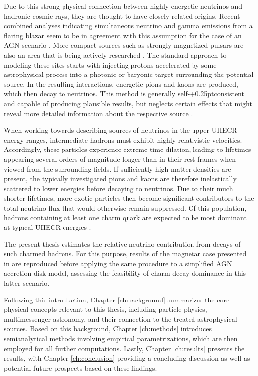 Due to this strong physical connection between highly energetic neutrinos and hadronic cosmic rays, they are thought to have
closely related origins. Recent combined analyses indicating simultaneous neutrino and gamma emissions from a
flaring blazar seem to be in agreement with this assumption for the case of an AGN scenario \cite{ic_blazar_flare, ic_blazar_signal}.
More compact sources such as strongly magnetized pulsars are also an area that is being actively researched \cite{Murase_2009}.
The standard approach to modeling these sites starts with injecting protons accelerated by some astrophysical process into
a photonic or baryonic target surrounding the potential source. In the resulting interactions, energetic pions and kaons are
produced, which then decay to neutrinos. This method is generally self-{\kern+0.25pt}consistent and capable of producing
plausible results, but neglects certain effects that might reveal more detailed information about the respective source
\cite{Carpio_2020}.

When working towards describing sources of neutrinos in the upper UHECR energy ranges, intermediate hadrons must exhibit
highly relativistic velocities. Accordingly, these particles experience extreme time dilation, leading to lifetimes
appearing several orders of magnitude longer than in their rest frames when viewed from the surrounding fields.
If sufficiently high matter densities are present, the typically investigated pions and kaons are therefore inelastically
scattered to lower energies before decaying to neutrinos. Due to their much shorter lifetimes, more exotic particles then
become significant contributors to the total neutrino flux that would otherwise remain suppressed. Of this population,
hadrons containing at least one charm quark are expected to be most dominant at typical UHECR energies \cite{Tjus_2023}.

The present thesis estimates the relative neutrino contribution from decays of such charmed hadrons. For this purpose, results
of the magnetar case presented in \cite{Carpio_2020} are reproduced before applying the same procedure to a simplified AGN
accretion disk model, assessing the feasibility of charm decay dominance in this latter scenario.

Following this introduction, Chapter \ref{ch:background} summarizes the core physical concepts relevant to this thesis,
including particle physics, multimessenger astronomy, and their connection to the treated astrophysical sources. Based
on this background, Chapter \ref{ch:methods} introduces semianalytical methods involving empirical parametrizations,
which are then employed for all further computations. Lastly, Chapter \ref{ch:results} presents the results, with Chapter
\ref{ch:conclusion} providing a concluding discussion as well as potential future prospects based on these findings.

